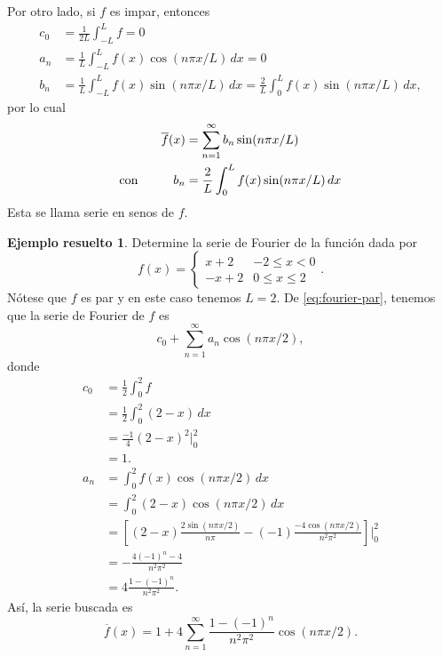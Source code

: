 \documentclass[11pt,letterpaper,draft]{report}
\theoremstyle{plain}
\theoremstyle{definition}
\newtheorem{solved}[theorem]{Ejemplo resuelto}
\theoremstyle{remark}
\newcommand\<{\langle}
\renewcommand\>{\rangle}
\begin{document}
Por otro lado, si $f$ es impar, entonces
\begin{align*}
  c_0 &= \frac{1}{2L}\int_{-L}^L f = 0 \\
  a_n
    &= \frac{1}{L}\int_{-L}^L f(x)\cos(n\pi x/L)\,dx
    = 0 \\
  b_n
    &= \frac{1}{L}\int_{-L}^L f(x)\sin(n\pi x/L)\,dx
    = \frac{2}{L}\int_{0}^L f(x)\sin(n\pi x/L)\,dx,
\end{align*}
por lo cual
\begin{equation}\label{eq:fourier-impar}
\begin{aligned}
  \overline{f}(x)
  &=
  \sum_{n=1}^{\infty}b_n\sin(n\pi x/L) \\
  \text{con}\hspace{10mm}
  b_n
  &= \frac{2}{L}\int_{0}^L f(x)\sin(n\pi x/L)\,dx
\end{aligned}
\end{equation}
Esta se llama serie en senos de $f$.

\begin{solved}
  Determine la serie de Fourier de la función dada por
  \[
    f(x) =
    \begin{cases}
      x+2 & -2\leq x<0 \\
      -x+2 & 0\leq x\leq 2
    \end{cases}
  .\]
  Nótese que $f$ es par y en este caso tenemos $L=2$.
  De \eqref{eq:fourier-par}, tenemos que la serie de Fourier de $f$ es
  \[
    c_0+\sum_{n=1}^{\infty}a_n\cos(n\pi x /2)
  ,\]
  donde
  \begin{align*}
    c_0
    &= \frac{1}{2}\int_{0}^{2}f \\
    &= \frac{1}{2}\int_{0}^{2}(2-x)\,dx \\
    &= \frac{-1}{4}(2-x)^{2}\Big|_{0}^{2} \\
    &= 1. \\
    a_n
    &= \int_{0}^{2}f(x)\cos(n\pi x /2)\,dx \\
    &= \int_{0}^{2}(2-x)\cos(n\pi x /2)\,dx \\
    &=
    \left[
      (2-x)\frac{2\sin(n\pi x /2)}{n\pi}
      -(-1) \frac{-4\cos(n\pi x /2)}{n^{2}\pi^{2}}
    \right]\Big|_{0}^{2}
    \\
    &=
      -\frac{4(-1)^{n}-4}{n^{2}\pi^{2}}
    \\
    &= 4\frac{1-(-1)^{n}}{n^{2}\pi^{2}}.
  \end{align*}
  Así, la serie buscada es
  \[
    \overline{f}(x)
    =
    1 + 4 \sum_{n=1}^{\infty}
    \frac{1-(-1)^{n}}{n^{2}\pi^{2}}\cos(n\pi x / 2)
  .\]
\end{solved}
\end{document}
